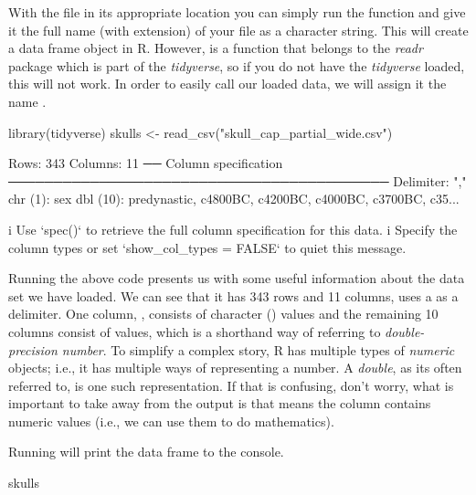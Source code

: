 With the file in its appropriate location you can simply run the function  and give it the full name (with extension) of your file as a character string. This will create a data frame object in R. However,  is a function that belongs to the \textit{readr} package which is part of the \textit{tidyverse}, so if you do not have the \textit{tidyverse} loaded, this will not work. In order to easily call our loaded data, we will assign it the name .

\begin{inR}
library(tidyverse)
skulls <- read_csv("skull_cap_partial_wide.csv")
\end{inR}

\begin{outR}
Rows: 343 Columns: 11                                             
── Column specification ──────────────────────────────────────────
Delimiter: ","
chr  (1): sex
dbl (10): predynastic, c4800BC, c4200BC, c4000BC, c3700BC, c35...

i Use `spec()` to retrieve the full column specification for this data.
i Specify the column types or set `show_col_types = FALSE` to quiet this message.
\end{outR}

Running the above code presents us with some useful information about the data set we have loaded.  We can see that it has 343 rows and 11 columns, uses a \R{,} as a delimiter. One column, , consists of character () values and the remaining 10 columns consist of  values, which is a shorthand way of referring to \textit{double-precision number}. To simplify a complex story, R has multiple types of \textit{numeric} objects; i.e., it has multiple ways of representing a number. A \textit{double}, as its often referred to, is one such representation. If that is confusing, don't worry, what is important to take away from the output is that  means the column contains numeric values (i.e., we can use them to do mathematics).

Running  will print the data frame to the console.

\begin{inR}
skulls
\end{inR}

